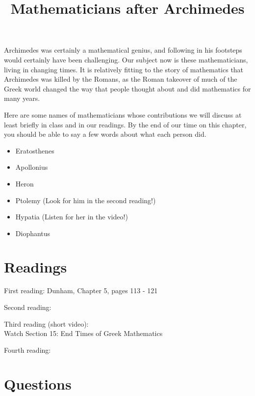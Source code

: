 \documentclass[nooutcomes]{ximera}
\title{Mathematicians after Archimedes}
\begin{document}
\begin{abstract}
    
\end{abstract}
\maketitle

Archimedes was certainly a mathematical genius, and following in his footsteps would certainly have been challenging.  Our subject now is these mathematicians, living in changing times.  It is relatively fitting to the story of mathematics that Archimedes was killed by the Romans, as the Roman takeover of much of the Greek world changed the way that people thought about and did mathematics for many years.

Here are some names of mathematicians whose contributions we will discuss at least briefly in class and in our readings.  By the end of our time on this chapter, you should be able to say a few words about what each person did.
\begin{itemize}
\item Eratosthenes 
\item Apollonius
\item Heron 
\item Ptolemy (Look for him in the second reading!)
\item Hypatia (Listen for her in the video!)
\item Diophantus
\end{itemize}




\section{Readings}
First reading: Dunham, Chapter 5, pages 113 - 121 

Second reading: 

Third reading (short video):  \\ Watch Section 15: End Times of Greek Mathematics

Fourth reading: 

\section{Questions}
\end{document}
